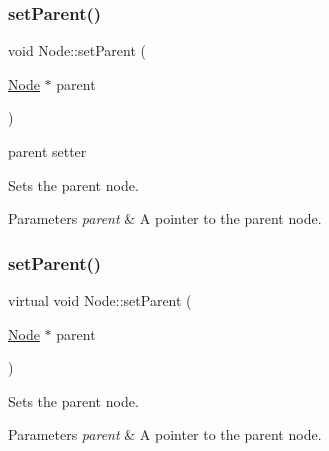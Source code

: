 \mbox{\label{classNode_ab5f0786bcb59591c528efb0b776797fc}} 
\subsubsection{\texorpdfstring{set\+Parent()}{setParent()}\hspace{0.1cm}{\footnotesize\ttfamily [1/2]}}
{\footnotesize\ttfamily void Node\+::set\+Parent (\begin{DoxyParamCaption}\item[{\hyperlink{classNode}{Node} $\ast$}]{parent }\end{DoxyParamCaption})\hspace{0.3cm}{\ttfamily [virtual]}}



parent setter 

Sets the parent node.


\begin{DoxyParams}{Parameters}
{\em parent} & A pointer to the parent node. \\
\hline
\end{DoxyParams}
\mbox{\label{classNode_ac4d4495d7ca6de96a2ce4dbc63514022}} 
\subsubsection{\texorpdfstring{set\+Parent()}{setParent()}\hspace{0.1cm}{\footnotesize\ttfamily [2/2]}}
{\footnotesize\ttfamily virtual void Node\+::set\+Parent (\begin{DoxyParamCaption}\item[{\hyperlink{classNode}{Node} $\ast$}]{parent }\end{DoxyParamCaption})\hspace{0.3cm}{\ttfamily [virtual]}}

Sets the parent node.


\begin{DoxyParams}{Parameters}
{\em parent} & A pointer to the parent node. \\
\hline
\end{DoxyParams}
\mbox{\label{classNode_a8ffbf25763ef5f15eeae7227779505bc}} 
